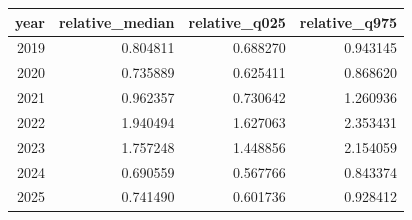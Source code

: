 \begin{tabular}{rrrr}
\toprule
year & relative\_median & relative\_q025 & relative\_q975 \\
\midrule
2019 & 0.804811 & 0.688270 & 0.943145 \\
2020 & 0.735889 & 0.625411 & 0.868620 \\
2021 & 0.962357 & 0.730642 & 1.260936 \\
2022 & 1.940494 & 1.627063 & 2.353431 \\
2023 & 1.757248 & 1.448856 & 2.154059 \\
2024 & 0.690559 & 0.567766 & 0.843374 \\
2025 & 0.741490 & 0.601736 & 0.928412 \\
\bottomrule
\end{tabular}
